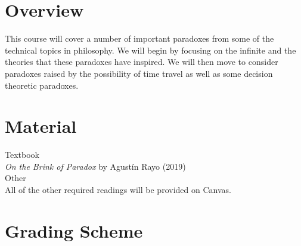 \documentclass[letterpaper]{infinity_syllabus} %
\begin{document}

\makeprofile %

\section{Overview}

This course will cover a number of important paradoxes from some of the technical topics in philosophy. %
We will begin by focusing on the infinite and the theories that these paradoxes have inspired.
We will then move to consider paradoxes raised by the possibility of time travel as well as some decision theoretic paradoxes.

\vspace{0.5cm} %
\section{Material}

{\color{myCOLOR} Textbook}\\
\textit{On the Brink of Paradox} by Agust\'{i}n Rayo (2019)\\

{\color{myCOLOR} Other}\\
All of the other required readings will be provided on Canvas.

\vspace{0.5cm}
\section{Grading Scheme}
\end{document}

